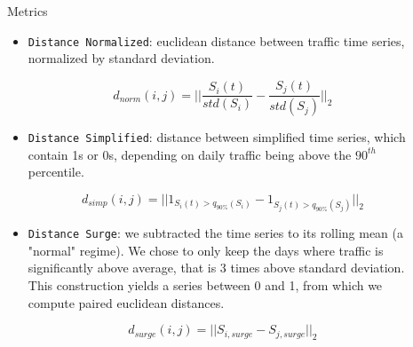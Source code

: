\documentclass[final]{beamer}
\newlength{\sepwid}
\newlength{\onecolwid}
\newlength{\twocolwid}
\begin{document}
\begin{frame}[t]
\begin{columns}[t]
\begin{column}{\onecolwid}
\end{column} %

\begin{column}{\sepwid}\end{column} %

\begin{column}{\twocolwid} %

\begin{columns}[t,totalwidth=\twocolwid] %

\begin{column}{\onecolwid}\vspace{-.6in} %


\begin{block}{Metrics}

  \begin{itemize}
  \item \texttt{Distance Normalized}: euclidean distance between traffic time series, normalized by standard deviation.

  $$d_{norm}(i, j) = ||\frac{S_i(t)}{std(S_i)} - \frac{S_j(t)}{std(S_j)}||_2$$

  \item \texttt{Distance Simplified}: distance between simplified time series, which contain 1s or 0s, depending on daily traffic being above the $90^{th}$ percentile.

  $$d_{simp}(i, j) = ||1_{S_i(t) > q_{90\%}(S_i)} - 1_{S_j(t) > q_{90\%}(S_j)}||_2$$

  \item \texttt{Distance Surge}: we subtracted the time series to its rolling mean (a "normal" regime). We chose to only keep the days where traffic is significantly above average, that is 3 times above standard deviation. This construction yields a series between 0 and 1, from which we compute paired euclidean distances.


  $$d_{surge}(i, j) = ||S_{i, surge} - S_{j, surge}||_2$$

  \begin{center}
  \end{center}
\end{itemize}


\end{block}
\end{column}
\end{columns}
\end{column}
\end{columns}
\end{frame}
\end{document}
